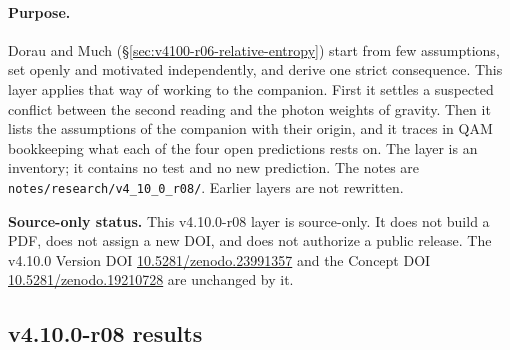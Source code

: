 \paragraph{Purpose.}
Dorau and Much (\S\ref{sec:v4100-r06-relative-entropy}) start from few assumptions, set openly and motivated independently, and derive one
strict consequence.  This layer applies that way of working to the companion.  First it settles a suspected conflict between the second reading
and the photon weights of gravity.  Then it lists the assumptions of the companion with their origin, and it traces in QAM bookkeeping what each of
the four open predictions rests on.  The layer is an inventory; it contains no test and no new prediction.  The notes are
\texttt{notes/\allowbreak research/\allowbreak v4\_10\_0\_r08/}.  Earlier layers are not rewritten.

\noindent\textbf{Source-only status.}
This v4.10.0-r08 layer is source-only.  It does not build a PDF, does not assign a new DOI,
and does not authorize a public release.  The v4.10.0 Version DOI
\href{https://doi.org/10.5281/zenodo.23991357}{10.5281/zenodo.23991357} and the Concept DOI
\href{https://doi.org/10.5281/zenodo.19210728}{10.5281/zenodo.19210728} are unchanged by it.

\subsection*{v4.10.0-r08 results}
\label{subsec:v4100-r08-results}

